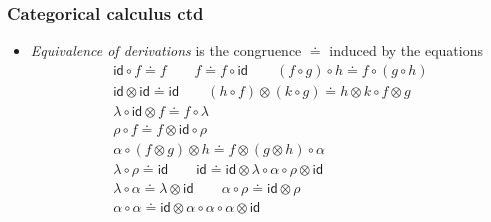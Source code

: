 \documentclass[10pt,t]{beamer}
\newcommand{\ot}{\otimes}
\newcommand{\al}{\alpha}
\newcommand{\lam}{\lambda}
\newcommand{\id}{\mathsf{id}}
\newcommand{\comp}{\circ}
\begin{document}
\begin{frame}

\frametitle{Categorical calculus ctd}

\begin{itemize}

\item \emph{Equivalence of derivations} is the congruence $\doteq$
  induced by the equations
\[
\begin{array}{c}
\id \comp f \doteq f
\qquad
f \doteq f \comp \id
\qquad
(f \comp g) \comp h \doteq f \comp (g \comp h)
\\[6pt]
\id \ot \id \doteq \id
\qquad 
(h \comp f) \ot (k \comp g) \doteq h \ot k \comp f \ot g
\\[6pt]
\lam \comp \id \ot f \doteq f \comp \lam
\\
\rho \comp f \doteq f \ot \id \comp \rho
\\
\al \comp (f \ot g) \ot h \doteq f \ot (g \ot h) \comp \al
\\[6pt]
\lam \comp \rho \doteq \id
\qquad
\id \doteq \id \ot \lam \comp \al \comp \rho \ot \id
\\
\lam \comp \al \doteq \lam \ot \id
\qquad
\al \comp \rho \doteq \id \ot \rho
\\
\al \comp \al \doteq \id \ot \al \comp \al \comp \al \ot \id 
\end{array}
\]

\end{itemize}

\end{frame}
\end{document}
